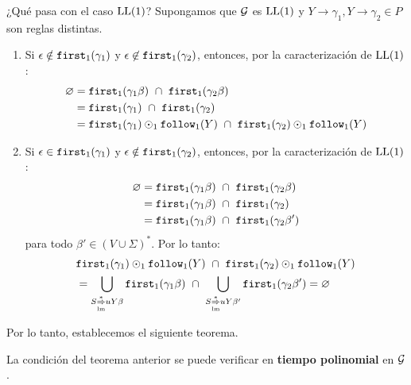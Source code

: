     ¿Qué pasa con el caso $\text{LL}(1)$? Supongamos que $\mathcal{G}$ es $\text{LL}(1)$ y $Y\to\gamma_1, Y\to\gamma_2 \in P$ son reglas distintas.
    \begin{enumerate}
        \item Si $\epsilon \notin \texttt{first}_1(\gamma_1)$ y $\epsilon \not\in \texttt{first}_1(\gamma_2)$, entonces, por la caracterización de $\text{LL}(1)$:
              \begin{align*}
                  \varnothing & = \first_1(\gamma_1 \beta) \ \cap \ \first_1(\gamma_2 \beta)                               \\
                              & = \first_1(\gamma_1) \ \cap \ \first_1(\gamma_2)                                           \\
                              & = \first_1(\gamma_1) \odot_1 \follow_1(Y) \ \cap \ \first_1(\gamma_2) \odot_1 \follow_1(Y)
              \end{align*}
        \item Si $\epsilon \in \texttt{first}_1(\gamma_1)$ y $\epsilon \notin \texttt{first}_1(\gamma_2)$, entonces, por la caracterización de $\text{LL}(1)$:
              \begin{align*}
                  \varnothing & = \first_1(\gamma_1 \beta) \ \cap \ \first_1(\gamma_2 \beta)  \\
                              & = \first_1(\gamma_1 \beta) \ \cap \ \first_1(\gamma_2)        \\
                              & = \first_1(\gamma_1 \beta) \ \cap \ \first_1(\gamma_2 \beta') \\
              \end{align*}
              para todo $\beta' \in (V \cup \Sigma)^*$. Por lo tanto:
              \begin{align*}
                   & \texttt{first}_1(\gamma_1) \odot_1 \texttt{follow}_1(Y) \ \cap \ \texttt{first}_1(\gamma_2) \odot_1 \texttt{follow}_1(Y)                                                                                                            \\
                   & = \bigcup_{S \underset{\mathrm{lm}}{\overset{*}{\Rightarrow}}uY\beta} \texttt{first}_1(\gamma_1 \beta) \ \cap \ \bigcup_{S \underset{\mathrm{lm}}{\overset{*}{\Rightarrow}}uY\beta'} \texttt{first}_1 (\gamma_2 \beta') = \varnothing
              \end{align*}
    \end{enumerate}

    Por lo tanto, establecemos el siguiente teorema.

    La condición del teorema anterior se puede verificar en \textbf{tiempo polinomial} en $\mathcal{G}$.

